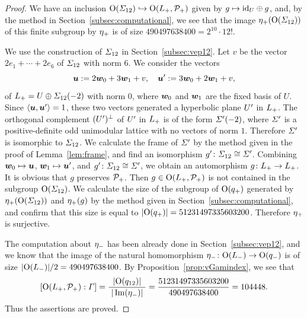 \documentclass{amsart} %
\begin{document}
\begin{proof}
We have an inclusion $\mathord{\mathrm{O}}(\varSigma_{12})\hookrightarrow \mathord{\mathrm{O}}(L_{+}, \mathord{\mathcal{P}}_{+})$
given by $g\mapsto \mathord{\mathrm{id}}_{U}\oplus g$,
and, by the method in Section~\ref{subsec:computational}, 
we see that 
 the image ${\eta}_{+}(\mathord{\mathrm{O}}(\varSigma_{12}))$ of this finite subgroup %
by ${\eta}_{+}$ is 
of size $490497638400=2^{10}\cdot 12!$.
 \par
 We use the construction of $\varSigma_{12}$ in Section~\ref{subsec:vep12}.
 Let $v$ be the  vector  $2e_1+\cdots +2e_6$ of $\varSigma_{12}$ with norm $6$.
 We consider the vectors
 \[
 \boldsymbol{u}:=2\boldsymbol{w}_0+ 3\boldsymbol{w}_1+v,
 \quad 
  \boldsymbol{u}^{\prime}:=3\boldsymbol{w}_0+ 2\boldsymbol{w}_1+v,
 \]
 of $L_{+}=U\oplus \varSigma_{12}(-2)$ with norm $0$,
 where $\boldsymbol{w}_0$ and $\boldsymbol{w}_1$ are the fixed basis of $U$. 
Since 
$\langle \boldsymbol{u}, \boldsymbol{u}^{\prime} \rangle=1$, these two vectors 
generated a hyperbolic plane $U^{\prime}$ in $L_{+}$.
 The orthogonal complement $(U^{\prime})^{\perp}$ of $U^{\prime}$ in $L_{+}$
 is of the form $\varSigma^{\prime}(-2)$,
where  $\varSigma^{\prime}$ is a positive-definite odd unimodular lattice
with no vectors of norm $1$.
Therefore  $\varSigma^{\prime}$ is isomorphic to $\varSigma_{12}$.
We calculate the frame of $\varSigma^{\prime}$ 
by the method given in the proof of Lemma~\ref{lem:frame},
and find an isomorphism $g^{\prime} \colon \varSigma_{12}\cong \varSigma^{\prime}$.
Combining $\boldsymbol{w}_0\mapsto \boldsymbol{u}$, $\boldsymbol{w}_1\mapsto \boldsymbol{u}^{\prime}$,
and $g^{\prime} \colon \varSigma_{12}\cong \varSigma^{\prime}$,
we obtain an automorphism  $g\colon L_{+}\to L_{+}$.
It is obvious that 
$g$ preserves $\mathord{\mathcal{P}}_{+}$.
Then $g\in \mathord{\mathrm{O}}(L_{+}, \mathord{\mathcal{P}}_{+})$
 is not contained in the subgroup $\mathord{\mathrm{O}}(\varSigma_{12})$.
We  calculate the size of the subgroup of $\mathord{\mathrm{O}}(q_{+})$
generated by ${\eta}_{+}(\mathord{\mathrm{O}}(\varSigma_{12}))$ and  ${\eta}_{+} (g)$
by the method given in Section~\ref{subsec:computational}, 
and confirm that 
this size is equal to $|\mathord{\mathrm{O}}(q_{+})|=51231497335603200$.
Therefore ${\eta}_{+}$ is surjective.
%
\par
The computation about ${\eta}_{-}$ has been already done in 
Section~\ref{subsec:vep12},
and we know that the image of 
the  natural homomorphism 
${\eta}_{-}\colon \mathord{\mathrm{O}}(L_{-})  \to  \mathord{\mathrm{O}}(q_{-})$
is of size 
$|\mathord{\mathrm{O}}(L_{-})|/2=490497638400$.
By Proposition~\ref{prop:vGamindex},
we see that 
\[
[\mathord{\mathrm{O}}(L_{+}, \mathord{\mathcal{P}}_{+}): \varGamma]
= \frac{ |\mathord{\mathrm{O}}(q_{12})|}{\; |\operatorname{Im}({\eta}_{-})|\;}
=
\frac{51231497335603200}{490497638400}
=
104448.
\]
Thus the assertions are proved.
\end{proof}
\end{document}
